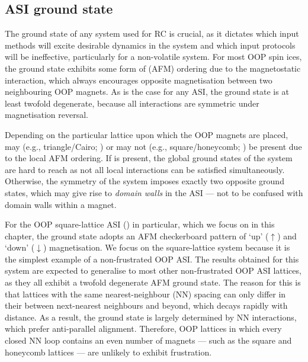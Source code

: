 \subsection{ASI ground state}
The ground state of any system used for RC is crucial, as it dictates which input methods will excite desirable dynamics in the system and which input protocols will be ineffective, particularly for a non-volatile system.
For most OOP spin ices, the ground state exhibits some form of  (AFM) ordering due to the magnetostatic interaction, which always encourages opposite magnetisation between two neighbouring OOP magnets.
As is the case for any ASI, the ground state is at least twofold degenerate, because all interactions are symmetric under magnetisation reversal. \par
Depending on the particular lattice upon which the OOP magnets are placed,  may (e.g., triangle/Cairo; ) or may not (e.g., square/honeycomb; ) be present due to the local AFM ordering.
If  is present, the global ground states of the system are hard to reach as not all local interactions can be satisfied simultaneously.
Otherwise, the symmetry of the system imposes exactly two opposite ground states, which may give rise to \textit{domain walls} in the ASI --- not to be confused with domain walls within a magnet. \par %
For the OOP square-lattice ASI () in particular, which we focus on in this chapter, the ground state adopts an AFM checkerboard pattern of `up' ($\uparrow$) and `down' ($\downarrow$) magnetisation.
We focus on the square-lattice system because it is the simplest example of a non-frustrated OOP ASI.
The results obtained for this system are expected to generalise to most other non-frustrated OOP ASI lattices, as they all exhibit a twofold degenerate AFM ground state.
The reason for this is that lattices with the same nearest-neighbour (NN) spacing can only differ in their  between next-nearest neighbours and beyond, which decays rapidly with distance.
As a result, the ground state is largely determined by NN interactions, which prefer anti-parallel alignment.
Therefore, OOP lattices in which every closed NN loop contains an even number of magnets --- such as the square and honeycomb lattices --- are unlikely to exhibit frustration.

